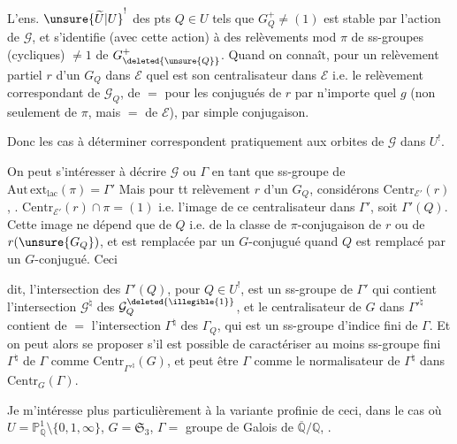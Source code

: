 
L'ens. $\unsure{\widetilde U|U}^{!}$ des pts $Q\in U$ tels que $G_Q^+\ne(1)$ est stable par l'action de $\mathcal G$, et s'identifie (avec cette action) à  des relèvements  mod $\pi$ de ss-groupes (cycliques) $\ne1$ de $G^{+}_{\deleted{\unsure{Q}}}$. Quand on connaît, pour un relèvement partiel $r$ d'un $G_Q$ dans $\mathcal E$ quel est son centralisateur dans $\mathcal E$ i.e. le relèvement correspondant de $\mathcal G_Q$,  de $=$ pour les conjugués de $r$ par n'importe quel  $g$ (non seulement de $\pi$, mais $=$ de $\mathcal E$), par simple conjugaison.

Donc les cas à déterminer correspondent pratiquement aux orbites de $\mathcal G$ dans $U^{!}$.

On peut s'intéresser à décrire $\mathcal G$ ou $\Gamma$ en tant que ss-groupe de $\mathrm{Aut\,ext}_{\mathrm{lac}}(\pi)=\Gamma'$  Mais pour tt relèvement $r$ d'un $G_Q$, considérons $\mathrm{Centr}_{\mathcal E'}(r)$,  .  $\mathrm{Centr}_{\mathcal E'}(r)\cap\pi=(1)$ i.e.  l'image de ce centralisateur dans $\Gamma'$, soit $\Gamma'(Q)$. Cette image ne dépend que de $Q$ i.e. de la classe de $\pi$-conjugaison de $r$ ou de $r(\unsure{G_Q})$, et est remplacée par un $G$-conjugué quand $Q$ est remplacé par un $G$-conjugué. Ceci



dit, l'intersection  des $\Gamma'(Q)$, pour $Q\in U^{!}$, est un ss-groupe de $\Gamma'$ qui contient l'intersection  $\mathcal G^{\natural}$ des $\mathcal G_Q^{\deleted{\illegible{1}}}$, et le centralisateur de $G$ dans $\Gamma'^{\natural}$ contient de $=$ l'intersection  $\Gamma^{\natural}$ des $\Gamma_Q$, qui est un ss-groupe  d'indice fini de $\Gamma$. Et on peut alors se proposer s'il est possible de caractériser au moins  ss-groupe fini $\Gamma^{\natural}$ de $\Gamma$ comme $\mathrm{Centr}_{\Gamma'^{\natural}}(G)$, et  peut être $\Gamma$ comme le normalisateur de $\Gamma^{\natural}$ dans  $\mathrm{Centr}_{G}(\Gamma)$.

Je m'intéresse plus particulièrement à la variante profinie de ceci, dans le cas où $U=\mathbb P^1_{\mathbb Q}\setminus\{0,1,\infty\}$, $G=\mathfrak S_3$, $\Gamma={}$ groupe de Galois de $\overline{\mathbb Q}/\mathbb Q$,  .

